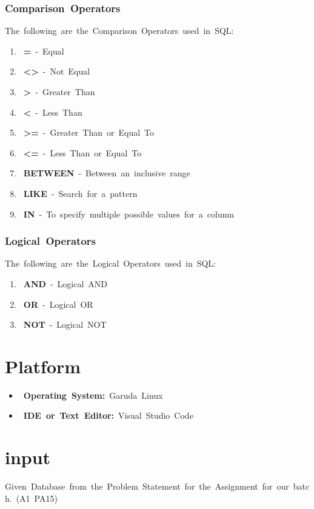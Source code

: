 \documentclass{article}
\begin{document}
	\subsubsection{\textbf{Comparison Operators}} 
	The following are the Comparison Operators used in SQL: 
	\begin{enumerate} 
		\item \textbf{=} - Equal 
		\item \textbf{<>} - Not Equal 
		\item \textbf{>} - Greater Than 
		\item \textbf{<} - Less Than 
		\item \textbf{>=} - Greater Than or Equal To 
		\item \textbf{<=} - Less Than or Equal To 
		\item \textbf{BETWEEN} - Between an inclusive range 
		\item \textbf{LIKE} - Search for a pattern 
		\item \textbf{IN} - To specify multiple possible values for a column 
	\end{enumerate} 
	
	\subsubsection{\textbf{Logical Operators}} 
	The following are the Logical Operators used in SQL: 
	\begin{enumerate} 
		\item \textbf{AND} - Logical AND 
		\item \textbf{OR} - Logical OR 
		\item \textbf{NOT} - Logical NOT 
	\end{enumerate} 
	
	\section{\textbf{Platform}} 
	\begin{itemize} 
		\item \textbf{Operating System:} Garuda Linux 
		\item \textbf{IDE or Text Editor:} Visual Studio Code 
	\end{itemize} 
	
	\section{\textbf{input}} 
	Given Database from the Problem Statement for the Assignment for our batch. (A1 PA15) 
	
\end{document}
